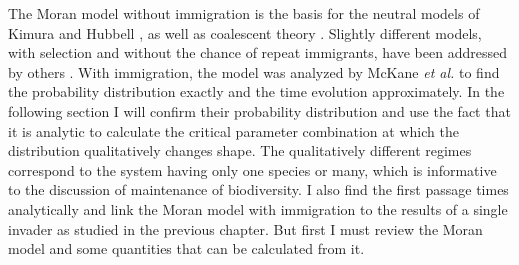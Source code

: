 The Moran model without immigration is the basis for the neutral models of Kimura \cite{Kimura1955,Crow1956,Patwa2008,Houchmandzadeh2010} and Hubbell \cite{Bell2000,Hubbell2001}, as well as coalescent theory \cite{Kingman1982,Blythe2007,Etheridge2010}. 
Slightly different models, with selection and without the chance of repeat immigrants, have been addressed by others \cite{Taylor2004,Claussen2005,Lambert2006,Blythe2007,Parsons2007,Pigolotti2013,Chalub2016,Czuppon2017}. 
With immigration, the model was analyzed by McKane \emph{et al.} \cite{McKane2003} to find the probability distribution exactly and the time evolution approximately. 
In the following section I will confirm their probability distribution and use the fact that it is analytic to calculate the critical parameter combination at which the distribution qualitatively changes shape. 
The qualitatively different regimes correspond to the system having only one species or many, which is informative to the discussion of maintenance of biodiversity. 
I also find the first passage times analytically and link the Moran model with immigration to the results of a single invader as studied in the previous chapter. 
But first I must review the Moran model and some quantities that can be calculated from it. 
\fi



